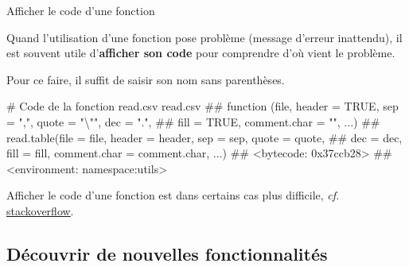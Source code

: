 \documentclass[12pt,ignorenonframetext,]{beamer}
\newenvironment{Shaded}{}{}
\newcommand{\CommentTok}[1]{\textcolor[rgb]{0.00,0.50,0.00}{{#1}}}
\newcommand{\NormalTok}[1]{{#1}}
\renewenvironment{Shaded}{\begin{snugshade}}{\end{snugshade}}
\begin{document}
\begin{frame}[fragile]{Afficher le code d'une fonction}

Quand l'utilisation d'une fonction pose problème (message d'erreur
inattendu), il est souvent utile d'\textbf{afficher son code} pour
comprendre d'où vient le problème.

\pause Pour ce faire, il suffit de saisir son nom sans parenthèses.

\footnotesize

\begin{Shaded}
\begin{Highlighting}[]
\CommentTok{# Code de la fonction read.csv}
\NormalTok{read.csv}
  \NormalTok{## function (file, header = TRUE, sep = ",", quote = "\textbackslash{}"", dec = ".", }
  \NormalTok{##     fill = TRUE, comment.char = "", ...) }
  \NormalTok{## read.table(file = file, header = header, sep = sep, quote = quote, }
  \NormalTok{##     dec = dec, fill = fill, comment.char = comment.char, ...)}
  \NormalTok{## <bytecode: 0x37ccb28>}
  \NormalTok{## <environment: namespace:utils>}
\end{Highlighting}
\end{Shaded}

\pause \normalsize
Afficher le code d'une fonction est dans certains cas plus difficile,
\emph{cf.}
\href{http://stackoverflow.com/questions/19226816/how-can-i-view-the-source-code-for-a-function}{\underline{stackoverflow}}.

\end{frame}

\subsection{Découvrir de nouvelles
fonctionnalités}\label{decouvrir-de-nouvelles-fonctionnalites}
\end{document}
